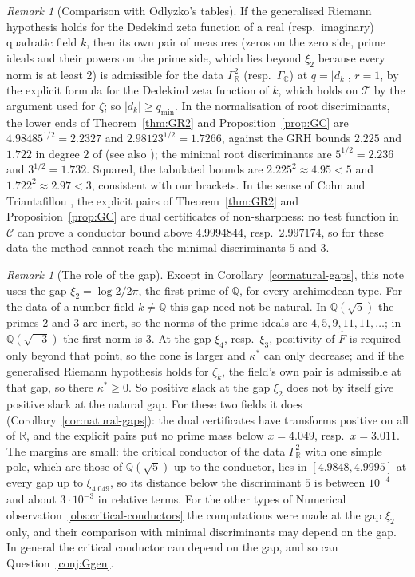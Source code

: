 \documentclass[11pt]{amsart}
\newcommand{\RR}{\mathbb R}
\newcommand{\QQ}{\mathbb Q}
\newcommand{\hF}{\widehat F}
\newcommand{\xin}[1]{\xi_{#1}}
\newcommand{\GR}{\Gamma_{\mathbb R}}
\newcommand{\GC}{\Gamma_{\mathbb C}}
\newcommand{\Tc}{\mathcal T}
\newcommand{\Cone}{\mathcal C}
\newcommand{\kstar}{\kappa^{*}}
\newcommand{\qmin}{q_{\min}}
\theoremstyle{definition}
\theoremstyle{remark}
\newtheorem{remark}[theorem]{Remark}
\numberwithin{equation}{section}
\begin{document}
\begin{remark}[Comparison with Odlyzko's tables]\label{rem:odlyzko}
If the generalised Riemann hypothesis holds for the Dedekind zeta function of a real (resp.\ imaginary) quadratic field $k$,
then its own pair of measures (zeros on the zero side, prime ideals and their powers on the prime side, which lies beyond
$\xin2$ because every norm is at least $2$) is admissible for the data $\GR^2$ (resp.\ $\GC$) at $q=\lvert d_k\rvert$, $r=1$, by the
explicit formula for the Dedekind zeta function of $k$, which holds on $\Tc$ by the argument used for $\zeta$; so
$\lvert d_k\rvert\ge\qmin$. In the normalisation of root discriminants, the lower ends of Theorem~\ref{thm:GR2} and
Proposition~\ref{prop:GC} are $4.98485^{1/2}=2.2327$ and $2.98123^{1/2}=1.7266$, against the GRH bounds $2.225$ and $1.722$ in
degree $2$ of \cite[Tables~4 and~3, p.~134]{Odl90} (see also \cite{Odl76,DyD80}); the minimal root discriminants are
$5^{1/2}=2.236$ and $3^{1/2}=1.732$. Squared, the tabulated bounds are $2.225^2\approx4.95<5$ and $1.722^2\approx2.97<3$, consistent with our
brackets. In the sense of Cohn and Triantafillou \cite{CT22}, the explicit pairs of Theorem~\ref{thm:GR2} and
Proposition~\ref{prop:GC} are dual certificates of non-sharpness: no test function in $\Cone$ can prove a conductor bound above
$4.9994844$, resp.\ $2.997174$, so for these data the method cannot reach the minimal discriminants $5$ and $3$.
\end{remark}

\begin{remark}[The role of the gap]\label{rem:gap}
Except in Corollary~\ref{cor:natural-gaps}, this note uses the gap $\xin2=\log2/2\pi$, the first prime of $\QQ$, for every archimedean
type. For the data of a number field $k\ne\QQ$ this gap need not be natural. In $\QQ(\sqrt5)$ the primes $2$ and $3$ are inert, so the
norms of the prime ideals are $4,5,9,11,11,\dots$; in $\QQ(\sqrt{-3})$ the first norm is $3$. At the gap $\xin4$, resp.\ $\xin3$,
positivity of $\hF$ is required only beyond that point, so the cone is larger and $\kstar$ can only decrease; and if the generalised
Riemann hypothesis holds for $\zeta_k$, the field's own pair is admissible at that gap, so there $\kstar\ge0$. So positive slack at
the gap $\xin2$ does not by itself give positive slack at the natural gap. For these two fields it does
(Corollary~\ref{cor:natural-gaps}): the dual certificates have transforms positive on all of $\RR$, and the explicit pairs put no prime
mass below $x=4.049$, resp.\ $x=3.011$. The margins are small: the critical conductor of the data $\GR^2$ with one simple pole, which
are those of $\QQ(\sqrt5)$ up to the conductor, lies in $[4.9848,4.9995]$ at every gap up to $\xin{4.049}$, so its distance below the
discriminant $5$ is between $10^{-4}$ and about $3\cdot10^{-3}$ in relative terms. For the other types of Numerical
observation~\ref{obs:critical-conductors} the computations were made at the gap $\xin2$ only, and their comparison with minimal
discriminants may depend on the gap. In general the critical conductor can depend on the gap, and so can Question~\ref{conj:Ggen}.
\end{remark}
\end{document}
